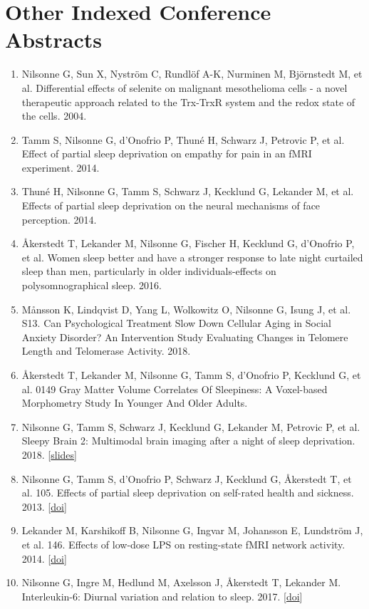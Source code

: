 \documentclass[10pt,a4paper,twocolumn]{article}
\begin{document}
\section{Other Indexed Conference Abstracts}
\begin{enumerate}

    \item Nilsonne G, Sun X, Nyström C, Rundlöf A-K, Nurminen M, Björnstedt M, et al. Differential effects of selenite on malignant mesothelioma cells - a novel therapeutic approach related to the Trx-TrxR system and the redox state of the cells. 2004.

    \item Tamm S, Nilsonne G, d'Onofrio P, Thuné H, Schwarz J, Petrovic P, et al. Effect of partial sleep deprivation on empathy for pain in an fMRI experiment. 2014.

    \item Thuné H, Nilsonne G, Tamm S, Schwarz J, Kecklund G, Lekander M, et al. Effects of partial sleep deprivation on the neural mechanisms of face perception. 2014.

    \item Åkerstedt T, Lekander M, Nilsonne G, Fischer H, Kecklund G, d'Onofrio P, et al. Women sleep better and have a stronger response to late night curtailed sleep than men, particularly in older individuals-effects on polysomnographical sleep. 2016.

    \item Månsson K, Lindqvist D, Yang L, Wolkowitz O, Nilsonne G, Isung J, et al. S13. Can Psychological Treatment Slow Down Cellular Aging in Social Anxiety Disorder? An Intervention Study Evaluating Changes in Telomere Length and Telomerase Activity. 2018.

    \item Åkerstedt T, Lekander M, Nilsonne G, Tamm S, d’Onofrio P, Kecklund G, et al. 0149 Gray Matter Volume Correlates Of Sleepiness: A Voxel-based Morphometry Study In Younger And Older Adults.

    \item Nilsonne G, Tamm S, Schwarz J, Kecklund G, Lekander M, Petrovic P, et al. Sleepy Brain 2: Multimodal brain imaging after a night of sleep deprivation. 2018. [\href{https://osf.io/vxmdj/}{slides}]

    \item Nilsonne G, Tamm S, d’Onofrio P, Schwarz J, Kecklund G, Åkerstedt T, et al. 105. Effects of partial sleep deprivation on self-rated health and sickness. 2013. [\href{https://doi.org/10.1016/j.bbi.2013.07.117}{doi}]

    \item Lekander M, Karshikoff B, Nilsonne G, Ingvar M, Johansson E, Lundström J, et al. 146. Effects of low-dose LPS on resting-state fMRI network activity. 2014. [\href{https://doi.org/10.1016/j.bbi.2014.06.166}{doi}]

    \item Nilsonne G, Ingre M, Hedlund M, Axelsson J, Åkerstedt T, Lekander M. Interleukin-6: Diurnal variation and relation to sleep. 2017. [\href{https://doi.org/10.1016/j.bbi.2017.07.042}{doi}]

\end{enumerate}
\end{document}
